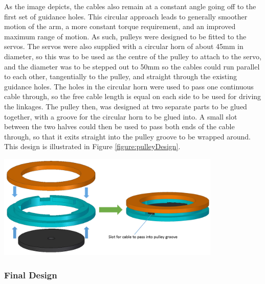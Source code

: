 \documentclass[11pt]{article}
\begin{document}
As the image depicts, the cables also remain at a constant angle going off to the first set of guidance holes. This circular approach leads to generally smoother motion of the arm, a more constant torque requirement, and an improved maximum range of motion. As such, pulleys were designed to be fitted to the servos. The servos were also supplied with a circular horn of about 45mm in diameter, so this was to be used as the centre of the pulley to attach to the servo, and the diameter was to be stepped out to 50mm so the cables could run parallel to each other, tangentially to the pulley, and straight through the existing guidance holes. The holes in the circular horn were used to pass one continuous cable through, so the free cable length is equal on each side to be used for driving the linkages. The pulley then, was designed at two separate parts to be glued together, with a groove for the circular horn to be glued into. A small slot between the two halves could then be used to pass both ends of the cable through, so that it exits straight into the pulley groove to be wrapped around. This design is illustrated in Figure \ref{figure:pulleyDesign}.

\begin{center}
\includegraphics[width=0.8\textwidth]{images/pulleyDesign.png}
\label{figure:pulleyDesign}
\end{center}



\subsubsection{Final Design}
\end{document}
